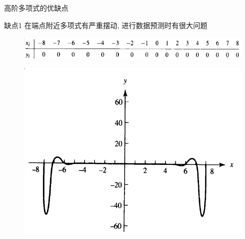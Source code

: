 \documentclass[UTF8]{ctexbeamer}
\begin{document}
\begin{frame}{高阶多项式的优缺点}
  \begin{block}{缺点1}
    在端点附近多项式有严重摆动, 进行数据预测时有很大问题
  \end{block}
  
  \begin{figure}
    \centering
    \includegraphics[width=.8\textwidth{}]{highorder-tab.png}
  \end{figure}
  \begin{figure}
    \centering
    \includegraphics[width=.5\textwidth{}]{highorder-fig.png}
  \end{figure}
  
\end{frame}
\end{document}
